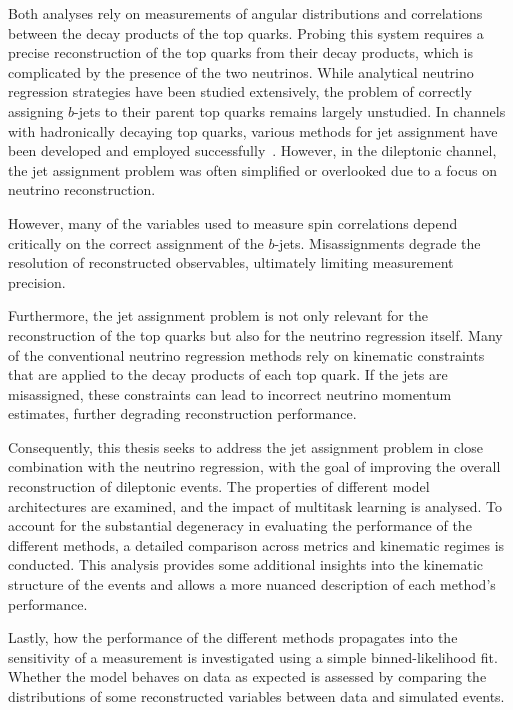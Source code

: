 Both analyses rely on measurements of angular distributions and correlations between the decay products of the top quarks. Probing this system requires a precise reconstruction of the top quarks from their decay products, which is complicated by the presence of the two neutrinos. While analytical neutrino regression strategies have been studied extensively, the problem of correctly assigning $b$-jets to their parent top quarks remains largely unstudied. In channels with hadronically decaying top quarks, various methods for jet assignment have been developed and employed successfully~\cite{spanet}. However, in the dileptonic channel, the jet assignment problem was often simplified or overlooked due to a focus on neutrino reconstruction.

However, many of the variables used to measure spin correlations depend critically on the correct assignment of the $b$-jets. Misassignments degrade the resolution of reconstructed observables, ultimately limiting measurement precision.

Furthermore, the jet assignment problem is not only relevant for the reconstruction of the top quarks but also for the neutrino regression itself. Many of the conventional neutrino regression methods rely on kinematic constraints that are applied to the decay products of each top quark. If the jets are misassigned, these constraints can lead to incorrect neutrino momentum estimates, further degrading reconstruction performance.

Consequently, this thesis seeks to address the jet assignment problem in close combination with the neutrino regression, with the goal of improving the overall reconstruction of dileptonic \ttbar events. The properties of different model architectures are examined, and the impact of multitask learning is analysed. To account for the substantial degeneracy in evaluating the performance of the different methods, a detailed comparison across metrics and kinematic regimes is conducted. This analysis provides some additional insights into the kinematic structure of the events and allows a more nuanced description of each method's performance.

Lastly, how the performance of the different methods propagates into the sensitivity of a measurement is investigated using a simple binned-likelihood fit. Whether the model behaves on data as expected is assessed by comparing the distributions of some reconstructed variables between \atlas data and simulated events.

